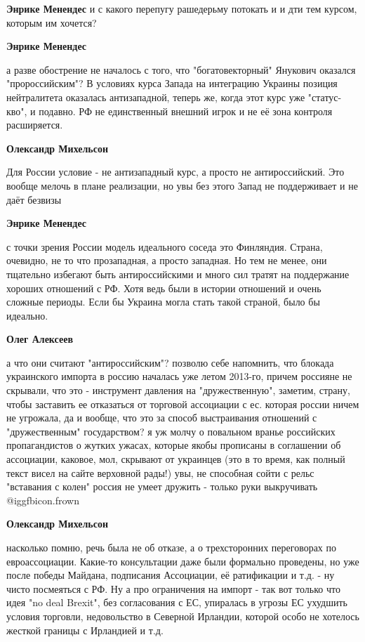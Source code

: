 \begin{itemize}
\begin{itemize}
\textbf{Энрике Менендес} и с какого перепугу рашедерьму потокать и и дти тем курсом, которым им хочется?

\textbf{Энрике Менендес} 

а разве обострение не началось с того, что "богатовекторный" Янукович оказался
"пророссийским"? В условиях курса Запада на интеграцию Украины позиция
нейтралитета оказалась антизападной, теперь же, когда этот курс уже
"статус-кво", и подавно. РФ не единственный внешний игрок и не её зона контроля
расширяется.


\textbf{Олександр Михельсон} 

Для России условие - не антизападный курс, а просто не антироссийский. Это
вообще мелочь в плане реализации, но увы без этого Запад не поддерживает и не
даёт безвизы

\textbf{Энрике Менендес} 

с точки зрения России модель идеального соседа это Финляндия. Страна, очевидно,
не то что прозападная, а просто западная. Но тем не менее, они тщательно
избегают быть антироссийскими и много сил тратят на поддержание хороших
отношений с РФ. Хотя ведь были в истории отношений и очень сложные периоды.
Если бы Украина могла стать такой страной, было бы идеально.

\textbf{Олег Алексеев} 

а что они считают "антироссийским"? позволю себе напомнить, что блокада
украинского импорта в россию началась уже летом 2013-го, причем россияне не
скрывали, что это - инструмент давления на "дружественную", заметим, страну,
чтобы заставить ее отказаться от торговой ассоциации с ес. которая россии ничем
не угрожала, да и вообще, что это за способ выстраивания отношений с
"дружественным" государством? я уж молчу о повальном вранье российских
пропагандистов о жутких ужасах, которые якобы прописаны в соглашении об
ассоциации, каковое, мол, скрывают от украинцев (это в то время, как полный
текст висел на сайте верховной рады!) увы, не способная сойти с рельс
"вставания с колен" россия не умеет дружить - только руки выкручивать  @igg{fbicon.frown} 

\textbf{Олександр Михельсон} 

насколько помню, речь была не об отказе, а о трехсторонних переговорах по
евроассоциации. Какие-то консультации даже были формально проведены, но уже
после победы Майдана, подписания Ассоциации, её ратификации и т.д. - ну чисто
посмеяться с РФ. Ну а про ограничения на импорт - так вот только что идея "no
deal Brexit", без согласования с ЕС, упиралась в угрозы ЕС ухудшить условия
торговли, недовольство в Северной Ирландии, которой особо не хотелось жесткой
границы с Ирландией и т.д.


\end{itemize}
\end{itemize}
